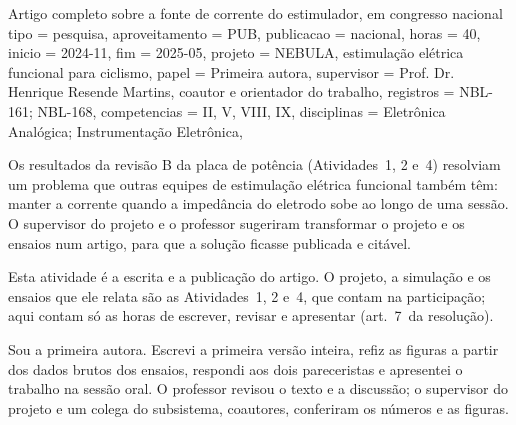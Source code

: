 \begin{atividade}{Artigo completo sobre a fonte de corrente do estimulador, em congresso nacional}{
  tipo           = pesquisa,
  aproveitamento = PUB,
  publicacao     = nacional,
  horas          = 40,
  inicio         = 2024-11,
  fim            = 2025-05,
  projeto        = {NEBULA, estimulação elétrica funcional para ciclismo},
  papel          = {Primeira autora},
  supervisor     = {Prof. Dr. Henrique Resende Martins, coautor e orientador do trabalho},
  registros      = {NBL-161; NBL-168},
  competencias   = {II, V, VIII, IX},
  disciplinas    = {Eletrônica Analógica; Instrumentação Eletrônica},
}

\begin{contexto}
Os resultados da revisão B da placa de potência (Atividades~1, 2 e~4) resolviam um problema que outras
equipes de estimulação elétrica funcional também têm: manter a corrente quando a impedância do eletrodo
sobe ao longo de uma sessão. O supervisor do projeto e o professor sugeriram transformar o projeto e os
ensaios num artigo, para que a solução ficasse publicada e citável.

Esta atividade é a escrita e a publicação do artigo. O projeto, a simulação e os ensaios que ele relata
são as Atividades~1, 2 e~4, que contam na participação; aqui contam só as horas de escrever, revisar e
apresentar (art.~7\textordmasculine\ da resolução).
\end{contexto}

\begin{contribuicao}
Sou a primeira autora. Escrevi a primeira versão inteira, refiz as figuras a partir dos dados brutos
dos ensaios, respondi aos dois pareceristas e apresentei o trabalho na sessão oral. O professor revisou
o texto e a discussão; o supervisor do projeto e um colega do subsistema, coautores, conferiram os
números e as figuras.
\end{contribuicao}

\begin{desenvolvimento}


\end{desenvolvimento}
\end{atividade}
